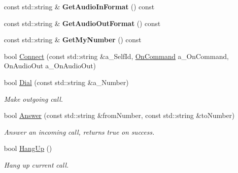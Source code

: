 \begin{DoxyCompactItemize}
\mbox{\label{class_telephony_afd8f4f89ce39bb4cf3a26c2019d1cb30}} 
const std\+::string \& {\bfseries Get\+Audio\+In\+Format} () const
\item 
\mbox{\label{class_telephony_a11c08895dc47a8a8ab33350e456c4465}} 
const std\+::string \& {\bfseries Get\+Audio\+Out\+Format} () const
\item 
\mbox{\label{class_telephony_a1ac58c6dd0e477b3876979b106d4e654}} 
const std\+::string \& {\bfseries Get\+My\+Number} () const
\item 
bool \hyperlink{class_telephony_aa419e85950a323e88bf8b0123a8bd56e}{Connect} (const std\+::string \&a\+\_\+\+Self\+Id, \hyperlink{class_telephony_ab5c5a24d45eb0612478a26dfbf11a168}{On\+Command} a\+\_\+\+On\+Command, On\+Audio\+Out a\+\_\+\+On\+Audio\+Out)
\item 
\mbox{\label{class_telephony_ac07f2c04c5f6c4697b59936528e07c9f}} 
bool \hyperlink{class_telephony_ac07f2c04c5f6c4697b59936528e07c9f}{Dial} (const std\+::string \&a\+\_\+\+Number)
\begin{DoxyCompactList}\small\item\em Make outgoing call. \end{DoxyCompactList}\item 
\mbox{\label{class_telephony_a390bfb55dc1a6314b9faa43d099c1693}} 
bool \hyperlink{class_telephony_a390bfb55dc1a6314b9faa43d099c1693}{Answer} (const std\+::string \&from\+Number, const std\+::string \&to\+Number)
\begin{DoxyCompactList}\small\item\em Answer an incoming call, returns true on success. \end{DoxyCompactList}\item 
\mbox{\label{class_telephony_acd9f3436d7dfcbabbdbde5f0ea8a51a7}} 
bool \hyperlink{class_telephony_acd9f3436d7dfcbabbdbde5f0ea8a51a7}{Hang\+Up} ()
\begin{DoxyCompactList}\small\item\em Hang up current call. \end{DoxyCompactList}\item 
\mbox{\label{class_telephony_a4dae6da4af340f564eca72fbdc1ea68a}} 

\end{DoxyCompactItemize}
